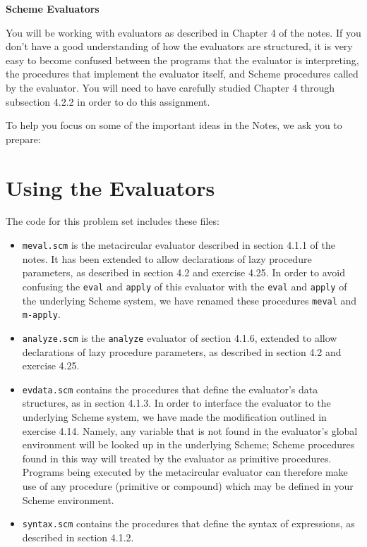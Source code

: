 

\newcommand{\Code}[1]{\mbox{\tt #1}}



\begin{center}\large
{\bf Scheme Evaluators}
\end{center}

\bigskip

You will be working with evaluators as described in Chapter 4 of the
notes.  If you don't have a good understanding of how the evaluators are
structured, it is very easy to become confused between the programs that
the evaluator is interpreting, the procedures that implement the evaluator
itself, and Scheme procedures called by the evaluator.  You will need to
have carefully studied Chapter 4 through subsection 4.2.2 in order to do
this assignment.

To help you focus on some of the important ideas in the Notes, we ask you
to prepare:

\section{Using the Evaluators}

The code for this problem set includes these files:
\begin{itemize}

\item {\tt meval.scm} is the metacircular evaluator described in
section 4.1.1 of the notes.  It has been extended to allow declarations of
lazy procedure parameters, as described in section 4.2 and exercise 4.25.
In order to avoid confusing the {\tt eval} and {\tt apply} of this
evaluator with the {\tt eval} and {\tt apply} of the underlying Scheme
system, we have renamed these procedures {\tt meval} and {\tt m-apply}.

\item {\tt analyze.scm} is the {\tt analyze} evaluator of section 4.1.6,
extended to allow declarations of lazy procedure parameters, as described
in section 4.2 and exercise 4.25.

\item {\tt evdata.scm} contains the procedures that define the evaluator's
data structures, as in section 4.1.3.  In order to interface the evaluator
to the underlying Scheme system, we have made the modification outlined in
exercise 4.14.  Namely, any variable that is not found in the evaluator's
global environment will be looked up in the underlying Scheme; Scheme
procedures found in this way will treated by the evaluator as primitive
procedures.  Programs being executed by the metacircular evaluator can
therefore make use of any procedure (primitive or compound) which may be
defined in your Scheme environment.

\item {\tt syntax.scm} contains the procedures that define the syntax of
expressions, as described in section 4.1.2.

\end{itemize}

